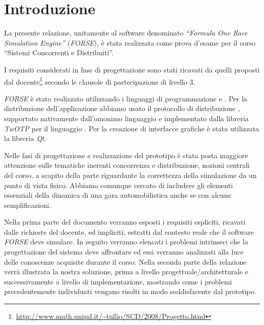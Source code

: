 \chapter{Introduzione}

La presente relazione, unitamente al software denominato \textsl{``Formula One Race Simulation Engine''} (\textsl{FORSE}), è stata realizzata come prova d'esame per il corso ``Sistemi Concorrenti e Distribuiti''.

I requisiti considerati in fase di progettazione sono stati ricavati da quelli proposti dal docente\footnote{\url{http://www.math.unipd.it/~tullio/SCD/2008/Progetto.html}} secondo le clausole di partecipazione di livello 3.

\textsl{FORSE} è stato realizzato utilizzando i linguaggi di programmazione \Erlang{} e \Python{}. Per la distribuzione dell'applicazione abbiamo
usato il protocollo di distribuzione \Erlang{}, supportato nativamente dall'omonimo linguaggio e implementato dalla libreria \textsl{TwOTP} per il linguaggio
\Python{}.
Per la creazione di interfacce grafiche è stata utilizzata la libreria \textsl{Qt}.

Nelle fasi di progettazione e realizzazione del prototipo è stata posta maggiore attenzione sulle tematiche inerenti concorrenza e distribuzione, nozioni
centrali del corso, a scapito della parte riguardante la correttezza della simulazione da un punto di vista fisico. Abbiamo comunque cercato di includere
gli elementi essenziali della dinamica di una gara automobilistica anche se con alcune semplificazioni.

Nella prima parte del documento verranno esposti i requisiti espliciti, ricavati dalle richieste del docente, ed impliciti, estratti dal contesto reale che il software \textsl{FORSE} deve simulare.
In seguito verranno elencati i problemi intrinseci che la progettazione del sistema deve affrontare ed essi verranno analizzati alla luce delle conoscenze acquisite durante il corso.
Nella seconda parte della relazione verrà illustrata la nostra soluzione, prima a livello progettuale/architetturale e successivamente a livello di implementazione, mostrando come i problemi precedentemente individuati vengano risolti in modo soddisfacente dal prototipo.
